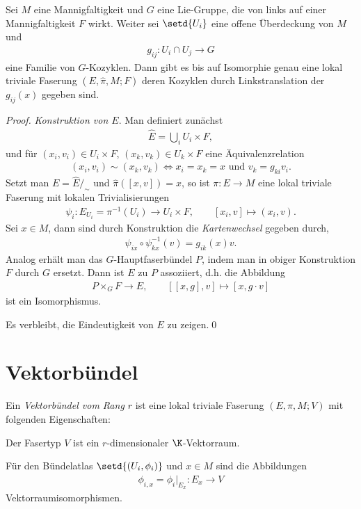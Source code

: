 \documentclass[%
	paper=a5,%
	fleqn,%
	DIV=18,%
	BCOR=0mm,
	fontsize=11pt,
	titlepage=false,%
	bibliography=totoc,
	DIV=18,%
	twoside=true,
	pdftitle=Riemannsche Geometrie,
	pdfauthor=Uwe Semmelmann,
	numbers=noendperiod]%
	{scrbook}
\begin{document}
\begin{prop}
\label{prop:Kozyklen-bestimmen-AFB-HFB}
Sei $M$ eine Mannigfaltigkeit und $G$ eine Lie-Gruppe, die von links auf einer
Mannigfaltigkeit $F$ wirkt. Weiter sei $\setd{U_i}$ eine offene Überdeckung
von $M$ und
\begin{align*}
g_{ij}: U_i\cap U_j\to G
\end{align*}
eine Familie von $G$-Kozyklen. Dann gibt es bis auf Isomorphie genau eine lokal
triviale Faserung $(E,\hat{\pi},M;F)$ deren Kozyklen durch Linkstranslation der
$g_{ij}(x)$ gegeben sind.\fish
\end{prop}
\begin{proof}
\textit{Konstruktion von $E$}. Man definiert zunächst
\begin{align*}
\hat{E} = \bigcup_{i} U_i\times F,
\end{align*}
und für $(x_i,v_i)\in U_i\times F$, $(x_k,v_k)\in U_k\times F$ eine
Äquivalenzrelation
\begin{align*}
(x_i,v_i)\sim (x_k,v_k) 
\iff x_i = x_k = x \text{ und }
v_k = g_{ki}v_i.
\end{align*}
Setzt man $E = \hat{E}/_\sim$ und $\hat{\pi}([x,v]) = x$, so ist $\pi: E\to M$
eine lokal triviale Faserung mit lokalen Trivialisierungen
\begin{align*}
\psi_i : E_{U_i} = \pi^{-1}(U_i) \to U_i\times F,\qquad [x_i,v]\mapsto (x_i,v).
\end{align*}
Sei $x\in M$, dann sind durch Konstruktion die \textit{Kartenwechsel} gegeben
durch,
\begin{align*}
\psi_{ix}\circ \psi_{kx}^{-1}(v) = g_{ik}(x)v.
\end{align*}
Analog erhält man das $G$-Hauptfaserbündel $P$, indem man in obiger Konstruktion
$F$ durch $G$ ersetzt.
Dann ist $E$ zu $P$ assoziiert, d.h. die Abbildung
\begin{align*}
P\times_G F\to E,\qquad [[x,g],v]\mapsto [x,g\cdot v]
\end{align*}
ist ein Isomorphismus.

Es verbleibt, die Eindeutigkeit von $E$ zu zeigen.\qed
\end{proof}

\section{Vektorbündel}

\begin{defn}
Ein \emph{Vektorbündel vom Rang $r$} ist eine lokal triviale Faserung
$(E,\pi,M;V)$ mit folgenden Eigenschaften:
\begin{defnenum}
\item Der Fasertyp $V$ ist ein $r$-dimensionaler $\K$-Vektorraum.
\item Für den Bündelatlas $\setd{(U_i,\phi_i)}$ und $x\in M$ sind die
Abbildungen
\begin{align*}
\phi_{i,x} = \phi_i\big|_{E_x}  : E_x \to V
\end{align*}
Vektorraumisomorphismen.\fish
\end{defnenum}
\end{defn}
\end{document}
